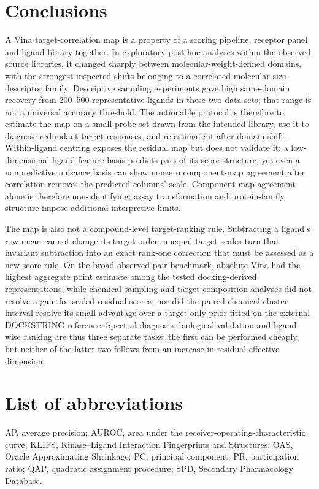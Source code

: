 \documentclass[11pt]{article}
\begin{document}
\section{Conclusions}

A Vina target-correlation map is a property of a scoring pipeline, receptor panel and ligand
library together. In exploratory post hoc analyses within the observed source libraries, it
changed sharply between molecular-weight-defined domains, with the strongest inspected shifts
belonging to a correlated molecular-size descriptor family. Descriptive sampling experiments
gave high same-domain recovery from 200--500 representative ligands in these two data sets;
that range is not a universal accuracy threshold. The actionable protocol is therefore to
estimate the map on a small probe set drawn from the intended
library, use it to diagnose redundant target responses, and re-estimate it after domain
shift. Within-ligand centring exposes the residual map but does not validate it: a
low-dimensional ligand-feature basis predicts part of its score structure, yet even a
nonpredictive nuisance basis can show nonzero component-map agreement after correlation
removes the predicted columns' scale. Component-map agreement alone is therefore
non-identifying; assay transformation and protein-family structure impose additional
interpretive limits.

The map is also not a compound-level target-ranking rule. Subtracting a ligand's row mean
cannot change its target order; unequal target scales turn that invariant subtraction into
an exact rank-one correction that must be assessed as a new score rule. On the broad
observed-pair benchmark, absolute Vina had the highest aggregate point estimate among the
tested docking-derived representations, while chemical-sampling and target-composition
analyses did not resolve a gain for scaled
residual scores; nor did the paired chemical-cluster interval resolve its small advantage
over a target-only prior fitted on the external DOCKSTRING reference. Spectral diagnosis,
biological validation and ligand-wise ranking are thus
three separate tasks: the first can be performed cheaply, but neither of the latter two
follows from an increase in residual effective dimension.

\section*{List of abbreviations}

AP, average precision; AUROC, area under the receiver-operating-characteristic curve;
KLIFS, Kinase--Ligand Interaction Fingerprints and Structures; OAS, Oracle Approximating
Shrinkage; PC, principal component; PR, participation ratio; QAP, quadratic assignment
procedure; SPD, Secondary Pharmacology Database.
\end{document}
